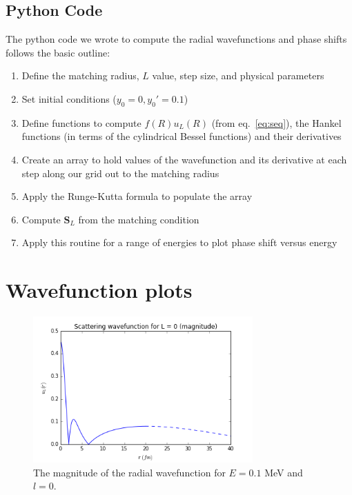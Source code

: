 \documentclass[]{scrartcl}
\begin{document}
\subsection*{Python Code}

The python code we wrote to compute the radial wavefunctions and phase shifts follows the basic outline:

\begin{enumerate}
	\item Define the matching radius, $L$ value, step size, and physical parameters
	\item Set initial conditions ($y_0 = 0, y_0 ' = 0.1$) 
	\item Define functions to compute $f(R)u_L(R)$ (from eq.~\ref{eq:seq}), the Hankel functions (in terms of the cylindrical Bessel functions) and their derivatives
	\item Create an array to hold values of the wavefunction and its derivative at each step along our grid out to the matching radius
	\item Apply the Runge-Kutta formula to populate the array
	\item Compute $\mathbf{S}_L$ from the matching condition
	\item Apply this routine for a range of energies to plot phase shift versus energy
\end{enumerate}


\section*{Wavefunction plots}

\begin{figure}[h]
\centering
	\includegraphics[width=0.75\textwidth]{figures/E01/magnitude0.png}
	\caption{The magnitude of the radial wavefunction for $E = 0.1$ MeV and $l=0$.}
	\label{fig:e01l0}
\end{figure}
\end{document}
